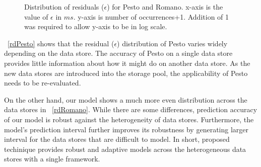 \begin{figure}
\centering
{}
\caption{Distribution of residuals ($\epsilon$) for Pesto and Romano.
x-axis is the value of $\epsilon$ in $ms$.
y-axis is number of occurrences+1.
Addition of 1 was required to allow y-axis to be in log scale.
}
\label{residualDist}
\end{figure}
\figurename~\ref{rdPesto} shows that the residual ($\epsilon$) distribution of Pesto varies widely depending on the data store.
The accuracy of Pesto on a single data store provides little information about how it might do on another data store.
As the new data stores are introduced into the storage pool, the applicability of Pesto needs to be re-evaluated.

On the other hand, our model shows a much more even distribution across the data stores in \figurename~\ref{rdRomano}.
While there are some differences, prediction accuracy of our model is robust against the heterogeneity of data stores.
Furthermore, the model's prediction interval further improves its robustness by generating larger interval for the data stores that are difficult to model.
In short, proposed techinique provides robust and adaptive models across the heterogeneous data stores with a single framework.

